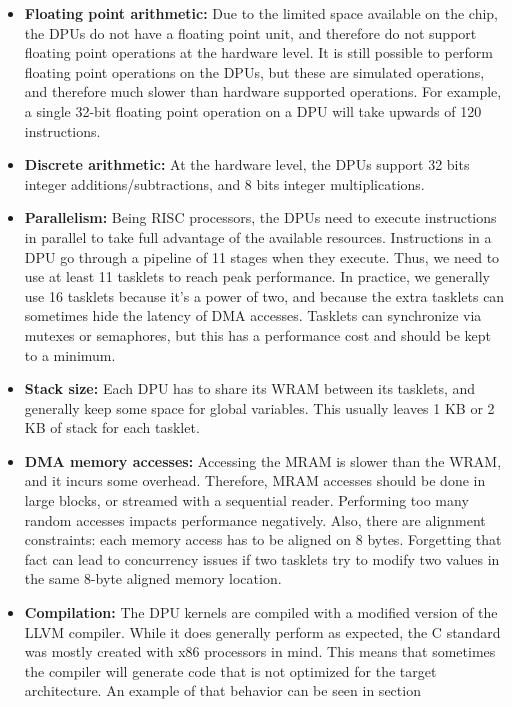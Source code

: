 \begin{itemize}
    \item \textbf{Floating point arithmetic:} Due to the limited space available on the chip, the DPUs do not have a floating point unit, and therefore do not support floating point operations at the hardware level. It is still possible to perform floating point operations on the DPUs, but these are simulated operations, and therefore much slower than hardware supported operations. For example, a single 32-bit floating point operation on a DPU will take upwards of 120 instructions.
    \item \textbf{Discrete arithmetic:} At the hardware level, the DPUs support 32 bits integer additions/subtractions, and 8 bits integer multiplications.
    \item \textbf{Parallelism:} Being RISC processors, the DPUs need to execute instructions in parallel to take full advantage of the available resources. Instructions in a DPU go through a pipeline of 11 stages when they execute. Thus, we need to use at least 11 tasklets to reach peak performance. In practice, we generally use 16 tasklets because it's a power of two, and because the extra tasklets can sometimes hide the latency of DMA accesses. Tasklets can synchronize via mutexes or semaphores, but this has a performance cost and should be kept to a minimum.
    \item \textbf{Stack size:} Each DPU has to share its WRAM between its tasklets, and generally keep some space for global variables. This usually leaves 1 KB or 2 KB of stack for each tasklet.
    \item \textbf{DMA memory accesses:} Accessing the MRAM is slower than the WRAM, and it incurs some overhead. Therefore, MRAM accesses should be done in large blocks, or streamed with a sequential reader. Performing too many random accesses impacts performance negatively. Also, there are alignment constraints: each memory access has to be aligned on 8 bytes. Forgetting that fact can lead to concurrency issues if two tasklets try to modify two values in the same 8-byte aligned memory location.
    \item \textbf{Compilation:} The DPU kernels are compiled with a modified version of the LLVM compiler. While it does generally perform as expected, the C standard was mostly created with x86 processors in mind. This means that sometimes the compiler will generate code that is not optimized for the target architecture. An example of that behavior can be seen in section %
\end{itemize}